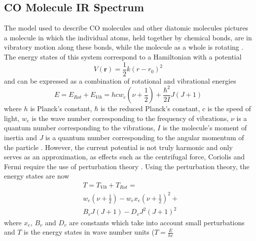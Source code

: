 \documentclass[reprint,amsmath,amssymb,aps, prl,superscriptaddress]{revtex4-2}
\begin{document}
\subsection{CO Molecule IR Spectrum}
The model used to describe CO molecules
and other diatomic molecules pictures a molecule in which the individual atoms, held together by chemical bonds, are in vibratory motion along these bonds, while the molecule as a whole is rotating \cite{alpert}. The energy states of this system correspond to a Hamiltonian with a potential 
\begin{equation} \label{eq:CO_Potential}
V(\boldsymbol{r})=\frac{1}{2}k(r-r_0)^2
\end{equation}
and can be expressed as a combination of rotational and vibrational energies
\begin{equation} \label{eq:CO_RotVibEnrg}
E=E_{Rot}+E_{Vib}= hcw_{e}(\nu +\frac{1}{2}) + \frac{\hbar  ^2}{2I}J(J+1)
\end{equation}
where $h$ is Planck's constant, $\hbar$ is the reduced Planck's constant, $c$ is the speed of light, $w_{e}$ is the wave number corresponding to the frequency of vibrations, $\nu$ is a quantum number corresponding to the vibrations,  $I$ is the molecule's moment of inertia and $J$ is a quantum number corresponding to the angular momentum of the particle \cite{griffithsQM}. However, the  current potential is not truly harmonic and only serves as an approximation,
as effects such as the centrifugal force, Coriolis and Fermi \cite{alpert} require the use of perturbation theory \cite{samurai}. Using the perturbation theory, the energy states are now
\begin{equation} \label{eq:CO_PeturbRotVibEnrg}
\begin{split}
& T=T_{Vib}+T_{Rot}=\\
& w_{e}(\nu +\frac{1}{2}) -w_{e}x_{e}(\nu +\frac{1}{2})^2+ \\
& B_{v}J(J+1)-D_{v}J^2(J+1)^2 
\end{split}
\end{equation}
where $x_{e}$, $B_{v}$ and $D_{v}$ are constants which take into account small perturbations and $T$ is the energy states in wave number units ($T=\frac{E}{hc}$
\end{document}
